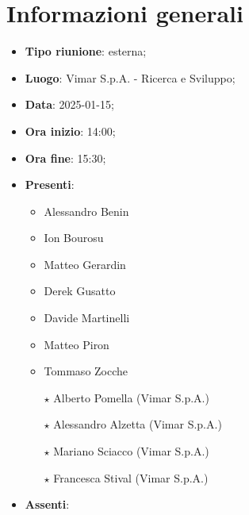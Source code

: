 \section{Informazioni generali}
\begin{itemize}
  \item \textbf{Tipo riunione}: esterna;
  \item \textbf{Luogo}: Vimar S.p.A. - Ricerca e Sviluppo;
  \item \textbf{Data}: 2025-01-15;
  \item \textbf{Ora inizio}: 14:00;
  \item \textbf{Ora fine}: 15:30;
  
  \item \textbf{Presenti}:
  \begin{itemize}
    \item Alessandro Benin
    \item Ion Bourosu
    \item Matteo Gerardin
    \item Derek Gusatto
    \item Davide Martinelli
    \item Matteo Piron
    \item Tommaso Zocche
    \item[$\star$] Alberto Pomella (Vimar S.p.A.)
    \item[$\star$] Alessandro Alzetta (Vimar S.p.A.)
    \item[$\star$] Mariano Sciacco (Vimar S.p.A.)
    \item[$\star$] Francesca Stival (Vimar S.p.A.)
  \end{itemize}

  \item \textbf{Assenti}:
 
\end{itemize}